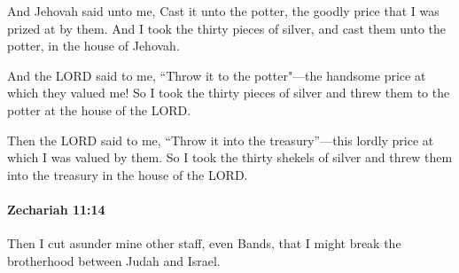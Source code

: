 			\begin{versebox}
					\item[BHS] 
					\item[LXX] 
					\item[ASV] And Jehovah said unto me, Cast it unto the potter, the goodly price that I was prized at by them. And I took the thirty pieces of silver, and cast them unto the potter, in the house of Jehovah.
					\item[NIV] And the LORD said to me, “Throw it to the potter"—the handsome price at which they valued me! So I took the thirty pieces of silver and threw them to the potter at the house of the LORD.
					\item[NRSV] Then the LORD said to me, “Throw it into the treasury”—this lordly price at which I was valued by them. So I took the thirty shekels of silver and threw them into the treasury in the house of the LORD.
			\end{versebox}

		\paragraph{Zechariah 11:14} %
			\label{ZECHARIAH-11-14}

			Then I cut asunder mine other staff, even Bands, that I might break the brotherhood between Judah and Israel.

